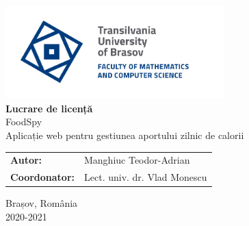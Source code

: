 \begin{titlepage}
	\begin{center}
		\includegraphics[width=240pt]{./Images/Logo/Logo-UT-MI-RGB-EN}
		\vspace*{48pt}\\
		\textbf{\LARGE Lucrare de licență}
		\vspace*{12pt}\\
		\LARGE FoodSpy\\
		\large Aplicație web pentru gestiunea aportului zilnic de calorii
		\vspace*{48pt}\\
		\begin{center}
			\large
			\begin{tabular}{ll}
				\textbf{Autor:}&Manghiuc Teodor-Adrian\\
				\textbf{Coordonator:}&Lect. univ. dr. Vlad Monescu\\
			\end{tabular}
		\end{center}
		
		\vfill
		\large Brașov, România\\2020-2021
	\end{center}
\end{titlepage}